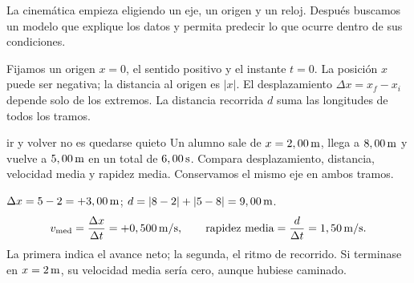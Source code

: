 \documentclass[11pt,a4paper]{article}
\begin{document}
\shorthandoff{<>}
\color{Ink}
La cinem\'atica empieza eligiendo un eje, un origen y un reloj. Despu\'es buscamos
un modelo que explique los datos y permita predecir lo que ocurre dentro de sus condiciones.
\begin{lessonindex}
\end{lessonindex}
\precisionnote

Fijamos un origen $x=0$, el sentido positivo y el instante $t=0$.
La posici\'on $x$ puede ser negativa; la distancia al origen es $|x|$.
El desplazamiento $\Delta x=x_f-x_i$ depende solo de los extremos.
La distancia recorrida $d$ suma las longitudes de todos los tramos.

\begin{examplebox}{ir y volver no es quedarse quieto}
 Un alumno sale de $x=2,00\,\mathrm{m}$, llega a $8,00\,\mathrm{m}$
y vuelve a $5,00\,\mathrm{m}$ en un total de $6,00\,\mathrm{s}$. Compara desplazamiento,
distancia, velocidad media y rapidez media.
\solutionblock
{} Conservamos el mismo eje en ambos tramos.
\begin{center}
\end{center}
 $\Delta x=5-2=+3,00\,\mathrm{m}$;
$d=|8-2|+|5-8|=9,00\,\mathrm{m}$.
\[
v_{\mathrm{med}}=\frac{\Delta x}{\Delta t}=+0,500\,\mathrm{m/s},\qquad
\text{rapidez media}=\frac d{\Delta t}=1,50\,\mathrm{m/s}.
\]
 La primera indica el avance neto; la segunda, el ritmo de
recorrido. Si terminase en $x=2\,\mathrm{m}$, su velocidad media ser\'ia cero,
aunque hubiese caminado.
\end{examplebox}
\end{document}
